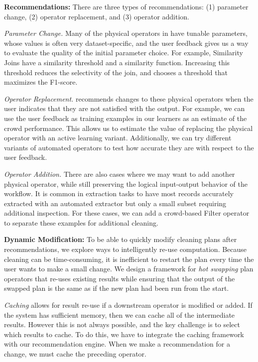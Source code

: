 {\noindent \bf Recommendations:} There are three types of recommendations: (1) parameter change, (2) operator replacement, and (3) operator addition.

\textit{Parameter Change.} Many of the physical operators in \sys have tunable parameters, whose values is often very dataset-specific, and the user feedback gives us a way to evaluate the quality of the initial parameter choice. 
For example, Similarity Joins have a similarity threshold and a similarity function. 
Increasing this threshold reduces the selectivity of the join, and \sys chooses a threshold that maximizes the F1-score. 

\textit{Operator Replacement.} 
\sys recommends changes to these physical operators when the user indicates that they are not satisfied with the output.
For example, we can use the user feedback as training examples in our learners as an estimate of the crowd performance.
This allows us to estimate the value of replacing the physical operator with an active learning variant.
Additionally, we can try different variants of automated operators to test how accurate they are with respect to the user feedback.

\textit{Operator Addition.}  There are also cases where we may want to add another physical operator, while still preserving the logical input-output behavior of the workflow.
It is common in extraction tasks to have most records accurately extracted with an automated extractor but only a small subset requiring additional inspection. 
For these cases, we can add a crowd-based Filter operator to separate these examples for additional cleaning.

\vspace{.5em}

{\noindent \bf Dynamic Modification:} To be able to quickly modify cleaning plans after recommendations, we explore ways to intelligently re-use computation. Because cleaning can be time-consuming, it is inefficient to 
restart the plan every time the user wants to make a small change.
We design a framework for \emph{hot swapping} plan operators that re-uses existing results while ensuring that the output of the swapped plan is the same as if the new plan had been run from the start.

\textit{Caching} allows for result re-use if a downstream operator is modified or added.
If the system has sufficient memory, then we can cache all of the intermediate results. 
However this is not always possible, and the key challenge is to select which results to cache.
To do this, we have to integrate the caching framework with our recommendation engine.
When we make a recommendation for a change, we must cache the preceding operator. 

